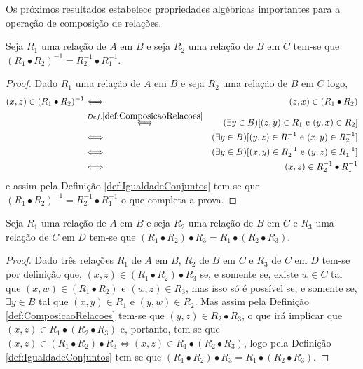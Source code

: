 Os próximos resultados estabelece propriedades algébricas importantes para a operação de composição de relações.

\begin{theorem}\label{teo:PseudoMorganRelacoes}
	Seja $R_1$ uma relação de $A$ em $B$ e seja $R_2$ uma relação de $B$ em $C$ tem-se que $(R_1 \bullet R_2)^{-1} = R_2^{-1} \bullet R_1^{-1}$.
\end{theorem}

\begin{proof}
	Dado $R_1$ uma relação de $A$ em $B$ e seja $R_2$ uma relação de $B$ em $C$ logo, 
	\begin{eqnarray*}
		(x, z) \in (R_1 \bullet R_2)^{-1} & \Longleftrightarrow & (z, x) \in (R_1 \bullet R_2)\\
		& \stackrel{Def. \ref{def:ComposicaoRelacoes}}{\Longleftrightarrow }& (\exists y \in B)[(z, y) \in R_1 \text{ e } (y, x) \in R_2]\\
		& \Longleftrightarrow & (\exists y \in B)[(y, z) \in R_1^{-1} \text{ e } (x, y) \in R_2^{-1}]\\
		& \Longleftrightarrow & (\exists y \in B)[(x, y) \in R_2^{-1} \text{ e }(y, z) \in R_1^{-1} ]\\
		& \Longleftrightarrow & (x, z) \in R_2^{-1} \bullet R_1^{-1}
	\end{eqnarray*} 
	e assim pela Definição \ref{def:IgualdadeConjuntos} tem-se que $(R_1 \bullet R_2)^{-1} = R_2^{-1} \bullet R_1^{-1}$ o que completa a prova.
\end{proof}

\begin{theorem}
	Seja $R_1$ uma relação de $A$ em $B$ e seja $R_2$ uma relação de $B$ em $C$ e $R_3$ uma relação de $C$ em $D$ tem-se que $(R_1 \bullet R_2) \bullet R_3 = R_1 \bullet (R_2 \bullet R_3)$.
\end{theorem}

\begin{proof}
	Dado três relações $R_1$ de $A$ em $B$, $R_2$ de $B$ em $C$ e $R_3$ de $C$ em $D$ tem-se por definição que, $(x, z) \in (R_1 \bullet R_2) \bullet R_3$ se, e somente se, existe $w \in C$ tal que $(x, w) \in (R_1 \bullet R_2)$ e $(w, z) \in R_3$, mas isso só é possível se, e somente se, $\exists y \in B$ tal que $(x, y) \in R_1$ e $(y, w) \in R_2$. Mas assim pela Definição \ref{def:ComposicaoRelacoes} tem-se que $(y, z) \in R_2 \bullet R_3$, o que irá implicar que $(x, z) \in R_1 \bullet (R_2 \bullet R_3)$ e, portanto, tem-se que $(x, z) \in (R_1 \bullet R_2) \bullet R_3 \Longleftrightarrow (x, z) \in R_1 \bullet (R_2 \bullet R_3)$, logo pela Definição \ref{def:IgualdadeConjuntos} tem-se que $(R_1 \bullet R_2) \bullet R_3 = R_1 \bullet (R_2 \bullet R_3)$.
\end{proof}

